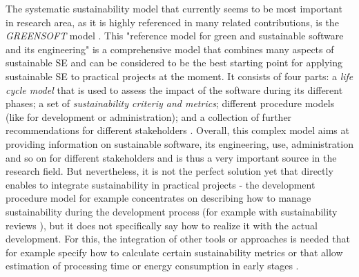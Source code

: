 \documentclass[oribibl]{llncs}
\begin{document}
The systematic sustainability model that currently seems to be most important %
in research area, as it is highly referenced in many related contributions, is the \textit{GREENSOFT} model \cite{naumann_greensoft_2011}. This "reference model for green and sustainable software and its engineering" \cite{naumann_greensoft_2011} is a comprehensive model that combines many aspects of sustainable SE %
and can be considered to be the best starting point for applying sustainable SE to practical projects at the moment. It consists of four parts: a \textit{life cycle model} that is used to assess the impact of the software during its different phases; a set of \textit{sustainability criteriy and metrics}; different procedure models (like for development or administration); and a collection of further recommendations for different stakeholders \cite{naumann_greensoft_2011}.
Overall, this complex model aims at providing information on sustainable software, its engineering, use, administration and so on for different stakeholders and is thus a very important source in the research field. But nevertheless, it is not the perfect solution yet that directly enables to integrate sustainability in practical projects - the development procedure model for example concentrates on describing how to manage sustainability %
during the development process (for example with sustainability reviews \cite{naumann_greensoft_2011}), but it does not specifically say how to realize it with the actual development. For this, the integration of other tools or approaches is needed that for example specify how to calculate certain sustainability metrics or that allow estimation of processing time or energy consumption in early stages \cite{naumann_greensoft_2011}. %
\end{document}
